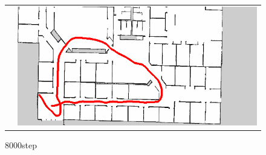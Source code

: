 \begin{figure}[h]
\begin{tabular}{cc}
\begin{minipage}[h]{0.45\hsize}
    \end{minipage} &
    \begin{minipage}[h]{0.45\hsize}
      \centering
      \includegraphics[keepaspectratio, scale=0.3]{images/exp1.2_8000_8.png}
    \end{minipage} \\
  \end{tabular}
   \caption*{8000step}
\end{figure}

